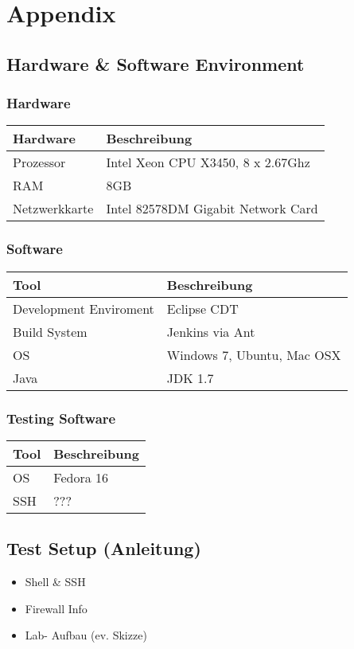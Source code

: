 \section{Appendix}

\subsection{Hardware \& Software Environment}

\subsubsection{Hardware}
\begin{tabular}[ht]{l l}
  Hardware & Beschreibung\\
  \hline
  Prozessor & Intel Xeon CPU X3450, 8 x 2.67Ghz\\
  RAM & 8GB\\
  Netzwerkkarte & Intel 82578DM Gigabit Network Card\\
\end{tabular}

\subsubsection{Software}
\begin{tabular}[ht]{l l}
  Tool & Beschreibung\\
  \hline
  Development Enviroment & Eclipse CDT\\
    Build System & Jenkins via Ant\\
  OS & Windows 7, Ubuntu, Mac OSX\\
  Java & JDK 1.7\\
\end{tabular}

\subsubsection{Testing Software}
\begin{tabular}[ht]{l l}
  Tool & Beschreibung\\
  \hline
  OS & Fedora 16\\
  SSH & ???\\
\end{tabular}

	
\subsection{Test Setup (Anleitung)}
\begin{itemize}
\item Shell \& SSH
\item Firewall Info
\item Lab- Aufbau (ev. Skizze)
\end{itemize}	
